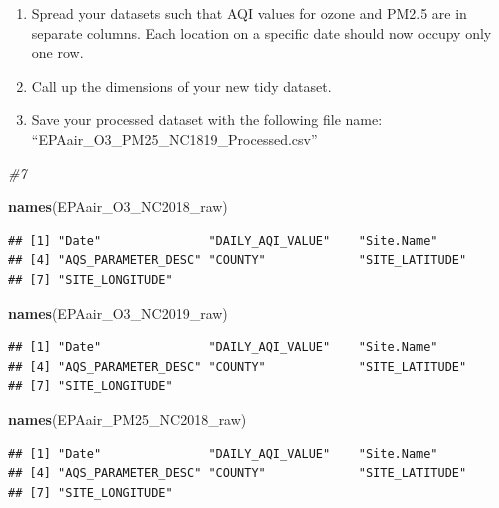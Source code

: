 \documentclass[
]{article}
\newenvironment{Shaded}{\begin{snugshade}}{\end{snugshade}}
\newcommand{\CommentTok}[1]{\textcolor[rgb]{0.56,0.35,0.01}{\textit{#1}}}
\newcommand{\FunctionTok}[1]{\textcolor[rgb]{0.13,0.29,0.53}{\textbf{#1}}}
\newcommand{\NormalTok}[1]{#1}
\begin{document}
\begin{enumerate}
\def\labelenumi{\arabic{enumi}.}
\setcounter{enumi}{8}
\item
  Spread your datasets such that AQI values for ozone and PM2.5 are in
  separate columns. Each location on a specific date should now occupy
  only one row.
\item
  Call up the dimensions of your new tidy dataset.
\item
  Save your processed dataset with the following file name:
  ``EPAair\_O3\_PM25\_NC1819\_Processed.csv''
\end{enumerate}

\begin{Shaded}
\begin{Highlighting}[]
\CommentTok{\#7 }

\FunctionTok{names}\NormalTok{(EPAair\_O3\_NC2018\_raw)}
\end{Highlighting}
\end{Shaded}

\begin{verbatim}
## [1] "Date"               "DAILY_AQI_VALUE"    "Site.Name"         
## [4] "AQS_PARAMETER_DESC" "COUNTY"             "SITE_LATITUDE"     
## [7] "SITE_LONGITUDE"
\end{verbatim}

\begin{Shaded}
\begin{Highlighting}[]
\FunctionTok{names}\NormalTok{(EPAair\_O3\_NC2019\_raw)}
\end{Highlighting}
\end{Shaded}

\begin{verbatim}
## [1] "Date"               "DAILY_AQI_VALUE"    "Site.Name"         
## [4] "AQS_PARAMETER_DESC" "COUNTY"             "SITE_LATITUDE"     
## [7] "SITE_LONGITUDE"
\end{verbatim}

\begin{Shaded}
\begin{Highlighting}[]
\FunctionTok{names}\NormalTok{(EPAair\_PM25\_NC2018\_raw)}
\end{Highlighting}
\end{Shaded}

\begin{verbatim}
## [1] "Date"               "DAILY_AQI_VALUE"    "Site.Name"         
## [4] "AQS_PARAMETER_DESC" "COUNTY"             "SITE_LATITUDE"     
## [7] "SITE_LONGITUDE"
\end{verbatim}
\end{document}
